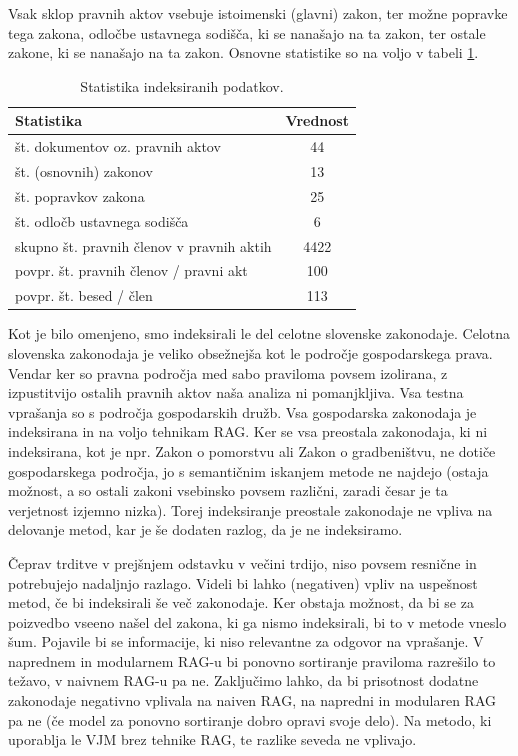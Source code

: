 \documentclass[a4paper,12pt,openright]{book}
\begin{document}
Vsak sklop pravnih aktov vsebuje istoimenski (glavni) zakon, ter možne popravke tega zakona, odločbe ustavnega sodišča, ki se nanašajo na ta zakon, ter ostale zakone, ki se nanašajo na ta zakon. Osnovne statistike so na voljo v tabeli \ref{statistika}.
\begin{table}[htbp]
    \centering
    \begin{tabular}{|l|c|}
        \hline
        Statistika & Vrednost \\ \hline
        št. dokumentov oz. pravnih aktov & 44 \\ \hline
        št. (osnovnih) zakonov & 13 \\ \hline
        št. popravkov zakona & 25 \\ \hline
        št. odločb ustavnega sodišča & 6 \\ \hline
        skupno št. pravnih členov v pravnih aktih & 4422 \\ \hline
        povpr. št. pravnih členov / pravni akt & 100 \\ \hline
        povpr. št. besed / člen & 113 \\ \hline
    \end{tabular}
    \caption{Statistika indeksiranih podatkov.}
    \label{statistika}
\end{table}

Kot je bilo omenjeno, smo indeksirali le del celotne slovenske zakonodaje. Celotna slovenska zakonodaja je veliko obsežnejša kot le področje gospodarskega prava. Vendar ker so pravna področja med sabo praviloma povsem izolirana, z izpustitvijo ostalih pravnih aktov naša analiza ni pomanjkljiva. Vsa testna vprašanja so s področja gospodarskih družb. Vsa gospodarska zakonodaja je indeksirana in na voljo tehnikam RAG. Ker se vsa preostala zakonodaja, ki ni indeksirana, kot je npr. Zakon o pomorstvu ali Zakon o gradbeništvu, ne dotiče gospodarskega področja, jo s semantičnim iskanjem metode ne najdejo (ostaja možnost, a so ostali zakoni vsebinsko povsem različni, zaradi česar je ta verjetnost izjemno nizka). Torej indeksiranje preostale zakonodaje ne vpliva na delovanje metod, kar je še dodaten razlog, da je ne indeksiramo.

Čeprav trditve v prejšnjem odstavku v večini trdijo, niso povsem resnične in potrebujejo nadaljnjo razlago. Videli bi lahko (negativen) vpliv na uspešnost metod, če bi indeksirali še več zakonodaje. Ker obstaja možnost, da bi se za poizvedbo vseeno našel del zakona, ki ga nismo indeksirali, bi to v metode vneslo šum. Pojavile bi se informacije, ki niso relevantne za odgovor na vprašanje. V naprednem in modularnem RAG-u bi ponovno sortiranje praviloma razrešilo to težavo, v naivnem RAG-u pa ne. Zaključimo lahko, da bi prisotnost dodatne zakonodaje negativno vplivala na naiven RAG, na napredni in modularen RAG pa ne (če model za ponovno sortiranje dobro opravi svoje delo). Na metodo, ki uporablja le VJM brez tehnike RAG, te razlike seveda ne vplivajo.
\end{document}

